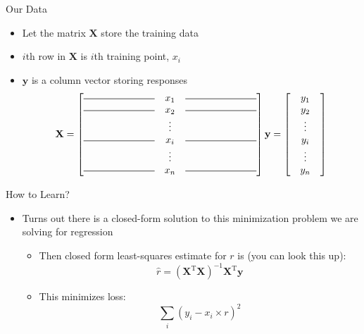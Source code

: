 \documentclass[aspectratio=169]{beamer}
\begin{document}
\begin{frame}{Our Data}

\begin{itemize}
		\item Let the matrix $\textbf{X}$ store the training data
		\item $i$th row in $\textbf{X}$ is $i$th training point, $x_i$
		\item $\textbf{y}$ is a column vector storing responses\
\[
 \textbf{X}  = \begin{bmatrix} 
 \rule[.025in]{1in}{0.5pt}	&x_1  & \rule[.025in]{1in}{0.5pt}	\\
 \rule[.025in]{1in}{0.5pt}	&x_2  & \rule[.025in]{1in}{0.5pt}	\\
	& $\vdots$ & 	\\
\rule[.025in]{1in}{0.5pt}		&x_i & \rule[.025in]{1in}{0.5pt}		\\
	&$\vdots$  & 	\\
 \rule[.025in]{1in}{0.5pt}	&x_n  & \rule[.025in]{1in}{0.5pt}	\\
\end{bmatrix} 
\textbf{y} = \begin{bmatrix} 
	 & y_1  & 	\\
	 & y_2  & 	\\
	 &  $\vdots$ & 	\\
	 & y_i & 	\\
	 & $\vdots$ & 	\\
	 & y_n& 	\\
\end{bmatrix} 
\]

 \end{itemize}
\end{frame}
\begin{frame}{How to Learn?}

\begin{itemize}
	\item Turns out there is a closed-form solution to this minimization problem we are solving for regression
        \begin{itemize} 
		\item Then closed form least-squares estimate for $r$ is (you can look this up):
			$$\hat{r} = (\textbf{X}^{\textrm{T}}\textbf{X})^{-1}\textbf{X}^{\textrm{T}}\textbf{y}$$
		\item This minimizes loss:
			$$ \sum_i (y_i - x_i \times r)^2$$
	\end{itemize}
\end{itemize}
\end{frame}
\end{document}
